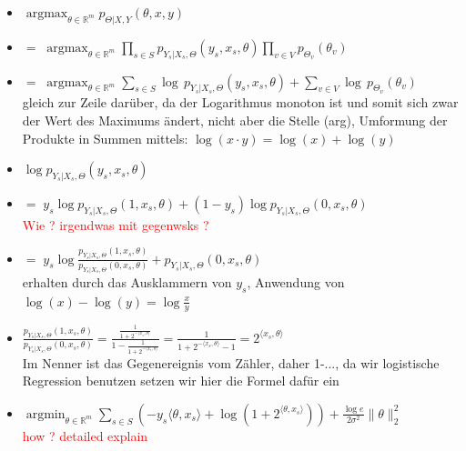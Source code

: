 \documentclass[12pt,a4paper]{article}
\DeclareMathOperator*{\argmin}{argmin}
\DeclareMathOperator*{\argmax}{argmax}
\newcommand{\red}[1]{\textcolor{red} {#1}}
\begin{document}
\begin{itemize}
\item $\displaystyle \argmax_{\theta\in\mathbb{R}^m} p_{\Theta|X,Y}(\theta, x, y)$
\item $\displaystyle =\; \argmax_{\theta\in\mathbb{R}^m} \prod_{s\in S} p_{Y_s|X_s,\Theta}(y_s,x_s,\theta)\prod_{v\in V} p_{\Theta_v}(\theta_v)$ 
\item $\displaystyle =\; \argmax_{\theta\in\mathbb{R}^m} \sum_{s\in S} \log\,p_{Y_s|X_s,\Theta}(y_s,x_s,\theta)+\sum_{v\in V} \log\,p_{\Theta_v}(\theta_v)$\\
gleich zur Zeile darüber, da der Logarithmus monoton ist und somit sich zwar der Wert des Maximums ändert, nicht aber die Stelle (arg), Umformung der Produkte in Summen mittels: $\log(x \cdot y) = \log(x) + \log(y)$
\item $\log p_{Y_s|X_s,\Theta}(y_s,x_s,\theta)$
\item $=\; y_s \log p_{Y_s|X_s,\Theta}(1,x_s,\theta) + (1-y_s)\log p_{Y_s|X_s,\Theta}(0,x_s,\theta)$\\
\red{Wie ? irgendwas mit gegenwsks ?}
\item $=\; y_s \log \frac{p_{Y_s|X_s,\Theta}(1,x_s,\theta)}{p_{Y_s|X_s,\Theta}(0,x_s,\theta)}+p_{Y_s|X_s,\Theta}(0,x_s,\theta)$\\
erhalten durch das Ausklammern von $y_s$, Anwendung von $\log (x) - \log (y) = \log \frac{x}{y}$
\item $\frac{p_{Y_s|X_s,\Theta}(1,x_s,\theta)}{p_{Y_s|X_s,\Theta}(0,x_s,\theta)}=\frac{\frac{1}{1+2^{-\langle x_s, \theta \rangle}}}{1-\frac{1}{1+2^{-\langle x_s, \theta \rangle}}}=\frac{1}{1+2^{-\langle x_s, \theta \rangle} -1}=2^{\langle x_s, \theta \rangle}$\\
Im Nenner ist das Gegenereignis vom Zähler, daher 1-..., da wir logistische Regression benutzen setzen wir hier die Formel dafür ein
\item $\displaystyle \argmin_{\theta \in \mathbb{R}^m} \sum_{s\in S} (-y_s \langle\theta,x_s\rangle + \log(1+2^{\langle \theta,x_s\rangle}))+\frac{\log e}{2\sigma^2}\|\theta\|^2_2$\\
\red{how ? detailed explain}
\end{itemize}
\end{document}
